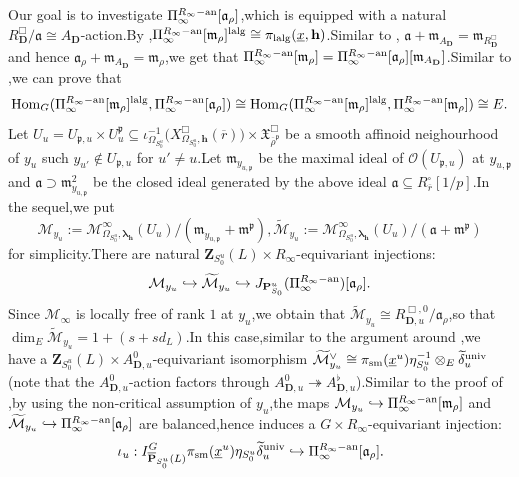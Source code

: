 \documentclass[10pt]{article}
\newcommand{\homo}{{\rm Hom}}
\newcommand{\ana}{{\rm an}}
\newcommand{\op}{{\overline{{\mathbf{P}}}}}
\newcommand{\sm}{{\rm sm}}
\newcommand{\lalg}{{\rm lalg}}
\newcommand{\Dpik}{{\mathbf{D}}}
\newcommand{\univ}{{\rm univ}}
\newcommand{\omepik}{\Omega_{S^u_0}}
\newcommand{\defvaru}{{X^\Box_{\omepik,\mathbf{{h}}}(\overline{r})}}
\newcommand{\bP}{{\mathbf{P}}}
\newcommand{\bZ}{{\mathbf{Z}}}
\newcommand{\bh}{{\mathbf{h}}}
\newcommand{\cM}{\mathcal M}
\newcommand{\cO}{\mathcal O}
\newcommand{\FX}{{\mathfrak{X}}}
\newcommand{\fa}{{\mathfrak{a}}}
\newcommand{\fm}{{\mathfrak{m}}}
\newcommand{\fp}{{\mathfrak{p}}}
\begin{document}
Our goal is to investigate $\Pi_\infty^{R_\infty-\ana}[\fa_{\rho}]$,\;which is equipped with a natural $R^{\Box}_{\Dpik}/\fa\cong A_{\Dpik}$-action.\;By \cite[Proposition 4.33]{PATCHING2016},\;$\Pi_\infty^{R_\infty-\ana}[\fm_{\rho}]^{\lalg}\cong \pi_{\lalg}(\underline{x},\bh)$.\;Similar to \cite[Lemma 4.2]{ParaDing2024},\; $\fa+\fm_{A_{\Dpik}}=\fm_{R^{\Box}_{\Dpik}}$ and hence $\fa_{\rho}+\fm_{A_{\Dpik}}=\fm_{\rho}$,\;we get that 
$\Pi_\infty^{R_\infty-\ana}[\fm_{\rho}]=\Pi_\infty^{R_\infty-\ana}[\fa_{\rho}][\fm_{A_{\Dpik}}]$.\;Similar to \cite[Lemma 4.2 (2)]{ParaDing2024},\;we can prove that
\[\homo_G(\Pi_\infty^{R_\infty-\ana}[\fm_{\rho}]^{\lalg},\Pi_\infty^{R_\infty-\ana}[\fa_{\rho}])\cong \homo_G(\Pi_\infty^{R_\infty-\ana}[\fm_{\rho}]^{\lalg},\Pi_\infty^{R_\infty-\ana}[\fm_{\rho}])\cong E.\]
Let $U_u=U_{\fp,u}\times U^{\fp}_u\subseteq  \iota^{-1}_{\omepik}\big(\defvaru\big)\times\FX_{\overline{\rho}^{\fp}}^{\Box}$ be a smooth affinoid neighourhood of $y_u$ such $y_{u'}\not\in U_{\fp,u}$ for $u'\neq u$.\;Let $\fm_{y_{u,\fp}}$ be the maximal ideal of $\cO(U_{\fp,u})$ at $y_{u,\fp}$ and $\fa\supset \fm^2_{y_{u,\fp}}$ be the closed ideal generated by the above ideal $\fa\subseteq R_{\overline{r}}^{\square}[1/p]$.\;In the sequel,\;we put
\[\cM_{y_u}:=\cM_{\omepik,{\bm\lambda}_\bh}^{\infty}(U_u)/(\fm_{y_{u,\fp}}+\fm^{\fp}),\widetilde{\cM}_{y_u}:=\cM_{\omepik,{\bm\lambda}_\bh}^{\infty}(U_u)/(\fa+\fm^{\fp})\]
for simplicity.\;There are natural $\bZ_{S^u_0}(L)\times R_{\infty}$-equivariant injections:
\[\cM_{y_u}\hookrightarrow \widetilde{\cM}_{y_u}\hookrightarrow J_{\bP^u_{S_0}}(\Pi_\infty^{R_\infty-\ana})[\fa_{\rho}].\]
Since $\cM_{\infty}$ is locally free of rank $1$ at $y_{u}$,\;we obtain that $\widetilde{\cM}_{y_u}\cong R^{\Box,0}_{\Dpik,u}/\fa_{\rho}$,\;so that $\dim_E\widetilde{\cM}_{y_u}=1+(s+sd_L)$.\;In this case,\;similar to the argument around \cite[(4.5)]{ParaDing2024},\;we have a $\bZ_{S^u_0}(L)\times A^{0}_{\Dpik,u}$-equivariant isomorphism $\widetilde{\cM}^{\vee}_{y_u}\cong \pi_{\sm}(\underline{x}^u)\eta^{-1}_{S^u_0}\otimes_E\widetilde{\delta}_u^{\univ}$ (note that the $A^{0}_{\Dpik,u}$-action factors through $A^{0}_{\Dpik,u}\twoheadrightarrow A^{\flat}_{\Dpik,u}$).\;Similar to the proof of \cite[Lemma 4.19]{He20222},\;by using the non-critical assumption of $y_u$,\;the maps $\cM_{y_u}\hookrightarrow  \Pi_\infty^{R_\infty-\ana}[\fm_{\rho}]$ and $ \widetilde{\cM}_{y_u}\hookrightarrow \Pi_\infty^{R_\infty-\ana}[\fa_{\rho}]$ are balanced,\;hence induces a $G\times R_{\infty}$-equivariant injection:
\begin{equation}
	\begin{aligned}
		&\iota_u:I^G_{\op_{S^u_0}(L)}\pi_{\sm}(\underline{x}^u)\eta_{S^u_0}\widetilde{\delta}_u^{\univ}\hookrightarrow \Pi_\infty^{R_\infty-\ana}[\fa_{\rho}].\;
	\end{aligned}
\end{equation}
\end{document}
